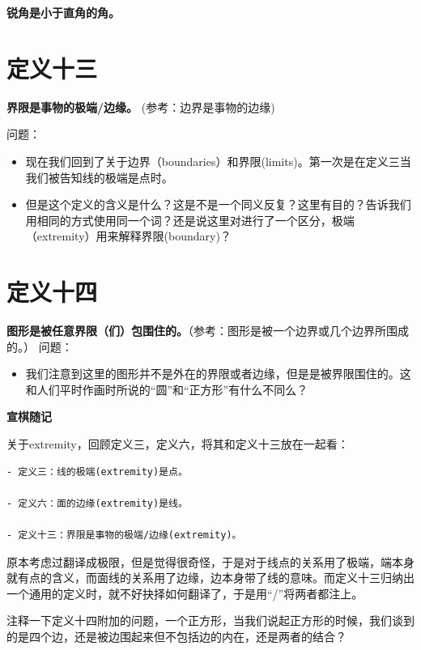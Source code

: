 \documentclass[
]{book}
\providecommand{\tightlist}{%
  \setlength{\itemsep}{0pt}\setlength{\parskip}{0pt}}
\begin{document}
\textbf{锐角是小于直角的角。}

\hypertarget{ux5b9aux4e49ux5341ux4e09}{%
\section{定义十三}\label{ux5b9aux4e49ux5341ux4e09}}

\textbf{界限是事物的极端/边缘。} (参考：边界是事物的边缘)

问题：

\begin{itemize}
\item
  现在我们回到了关于边界（boundaries）和界限(limits)。第一次是在定义三当我们被告知线的极端是点时。
\item
  但是这个定义的含义是什么？这是不是一个同义反复？这里有目的？告诉我们用相同的方式使用同一个词？还是说这里对进行了一个区分，极端（extremity）用来解释界限(boundary)？
\end{itemize}

\hypertarget{ux5b9aux4e49ux5341ux56db}{%
\section{定义十四}\label{ux5b9aux4e49ux5341ux56db}}

\textbf{图形是被任意界限（们）包围住的。}（参考：图形是被一个边界或几个边界所围成的。）
问题：

\begin{itemize}
\tightlist
\item
  我们注意到这里的图形并不是外在的界限或者边缘，但是是被界限围住的。这和人们平时作画时所说的``圆''和``正方形''有什么不同么？
\end{itemize}

\textbf{宣棋随记}

关于extremity，回顾定义三，定义六，将其和定义十三放在一起看：

\begin{verbatim}
- 定义三：线的极端(extremity)是点。

- 定义六：面的边缘(extremity)是线。

- 定义十三：界限是事物的极端/边缘(extremity)。
\end{verbatim}

原本考虑过翻译成极限，但是觉得很奇怪，于是对于线点的关系用了极端，端本身就有点的含义，而面线的关系用了边缘，边本身带了线的意味。而定义十三归纳出一个通用的定义时，就不好抉择如何翻译了，于是用``/''将两者都注上。

注释一下定义十四附加的问题，一个正方形，当我们说起正方形的时候，我们谈到的是四个边，还是被边围起来但不包括边的内在，还是两者的结合？
\end{document}
